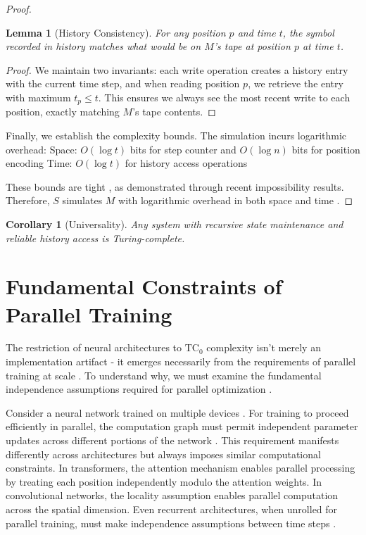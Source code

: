 \documentclass[12pt]{article}
\newtheorem{lemma}[theorem]{Lemma}
\newtheorem{corollary}[theorem]{Corollary}
\begin{document}
\begin{proof}
\begin{lemma}[History Consistency]
For any position $p$ and time $t$, the symbol recorded in history matches what would be on $M$'s tape at position $p$ at time $t$.
\end{lemma}

\begin{proof}
We maintain two invariants: each write operation creates a history entry with the current time step, and when reading position $p$, we retrieve the entry with maximum $t_p \leq t$. This ensures we always see the most recent write to each position, exactly matching $M$'s tape contents.
\end{proof}

Finally, we establish the complexity bounds. The simulation incurs logarithmic overhead:
Space: $O(\log t)$ bits for step counter and $O(\log n)$ bits for position encoding
Time: $O(\log t)$ for history access operations

These bounds are tight \cite{parzych2024memory,hhan2024new,boyle2024memory}, as demonstrated through recent impossibility results. Therefore, $S$ simulates $M$ with logarithmic overhead in both space and time \cite{savage1994space,vonkorff2019molecular,bennett1989time}.
\end{proof}

\begin{corollary}[Universality]
Any system with recursive state maintenance and reliable history access is Turing-complete.
\end{corollary}

\section{Fundamental Constraints of Parallel Training}

The restriction of neural architectures to $\text{TC}_0$ complexity isn't merely an implementation artifact - it emerges necessarily from the requirements of parallel training at scale \cite{merrill2023parallelism,peng2024limitations}. To understand why, we must examine the fundamental independence assumptions required for parallel optimization \cite{shallue2019measuring}.

Consider a neural network trained on multiple devices \cite{zhao2024epha}. For training to proceed efficiently in parallel, the computation graph must permit independent parameter updates across different portions of the network \cite{barrett2019analyzing}. This requirement manifests differently across architectures but always imposes similar computational constraints. In transformers, the attention mechanism enables parallel processing by treating each position independently modulo the attention weights. In convolutional networks, the locality assumption enables parallel computation across the spatial dimension. Even recurrent architectures, when unrolled for parallel training, must make independence assumptions between time steps \cite{dickson2023rnns}.
\end{document}
